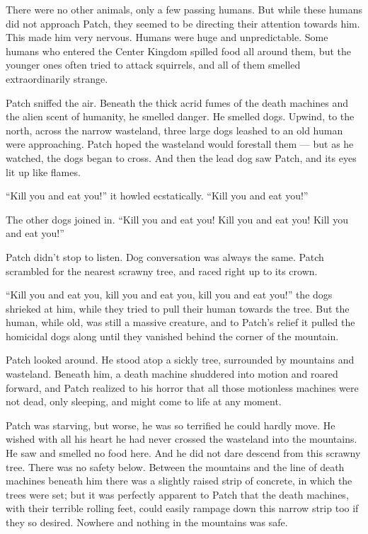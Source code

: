 \documentclass[ebook,oneside,openany,17pt]{memoir}
\begin{document}
There were no other animals, only a few passing humans. But while
these humans did not approach Patch, they seemed to be directing their
attention towards him. This made him very nervous. Humans were huge
and unpredictable. Some humans who entered the Center Kingdom spilled
food all around them, but the younger ones often tried to attack
squirrels, and all of them smelled extraordinarily strange.

Patch sniffed the air. Beneath the thick acrid fumes of the death
machines and the alien scent of humanity, he smelled danger. He
smelled dogs. Upwind, to the north, across the narrow wasteland, three
large dogs leashed to an old human were approaching. Patch hoped the
wasteland would forestall them — but as he watched, the dogs began to
cross. And then the lead dog saw Patch, and its eyes lit up like
flames.

“Kill you and eat you!” it howled ecstatically. “Kill you and eat
you!”

The other dogs joined in. “Kill you and eat you! Kill you and eat you!
Kill you and eat you!”

Patch didn’t stop to listen. Dog conversation was always the
same. Patch scrambled for the nearest scrawny tree, and raced right up
to its crown.

“Kill you and eat you, kill you and eat you, kill you and eat you!”
the dogs shrieked at him, while they tried to pull their human towards
the tree. But the human, while old, was still a massive creature, and
to Patch’s relief it pulled the homicidal dogs along until they
vanished behind the corner of the mountain.

Patch looked around. He stood atop a sickly tree, surrounded by
mountains and wasteland. Beneath him, a death machine shuddered into
motion and roared forward, and Patch realized to his horror that all
those motionless machines were not dead, only sleeping, and might come
to life at any moment.

Patch was starving, but worse, he was so terrified he could hardly
move. He wished with all his heart he had never crossed the wasteland
into the mountains. He saw and smelled no food here. And he did not
dare descend from this scrawny tree. There was no safety
below. Between the mountains and the line of death machines beneath
him there was a slightly raised strip of concrete, in which the trees
were set; but it was perfectly apparent to Patch that the death
machines, with their terrible rolling feet, could easily rampage down
this narrow strip too if they so desired. Nowhere and nothing in the
mountains was safe.
\end{document}
